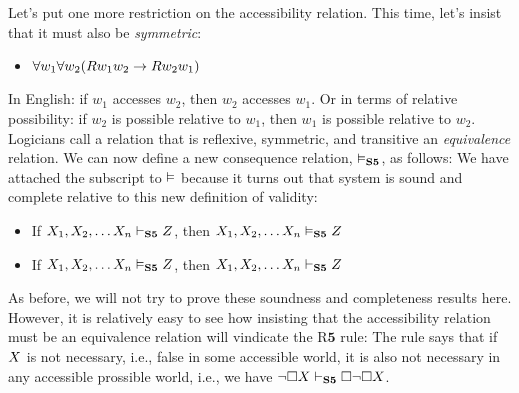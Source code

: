 Let's put one more restriction on the accessibility relation. This time, let's insist that it must also be \emph{symmetric}:
\begin{itemize}
	\item $\forall w_1\forall w_2(Rw_1w_2 \rightarrow Rw_2w_1)$
\end{itemize}
In English: if $w_1$ accesses $w_2$, then $w_2$ accesses $w_1$. Or in terms of relative possibility: if $w_2$ is possible relative to $w_1$, then $w_1$ is possible relative to $w_2$. Logicians call a relation that is reflexive, symmetric, and transitive an \emph{equivalence} relation. We can now define a new consequence relation, $\vDash_{\mathbf{S5}} $, as follows:
We have attached the \mlSfive{} subscript to $\vDash$ because it turns out that system \mlSfive{} is sound and complete relative to this new definition of validity:
\begin{itemize}
	\item If $X_1,X_2, \dots X_n\vdash_{\mathbf{S5}} Z$, then $X_1,X_2, \dots X_n\vDash_{\mathbf{S5}} Z$
	\item If $X_1,X_2, \dots X_n\vDash_{\mathbf{S5}} Z$, then $X_1,X_2, \dots X_n\vdash_{\mathbf{S5}} Z$
\end{itemize}
As before, we will not try to prove these soundness and completeness results here. However, it is relatively easy to see how insisting that the accessibility relation must be an equivalence relation will vindicate the R$\mathbf{5}$ rule:
The rule says that if $X$ is not necessary, i.e., false in some accessible world, it is also not necessary in any accessible prossible world, i.e., we have $\neg\Box X \vdash_{\mathbf{S5}}  \Box\neg\Box X$.

